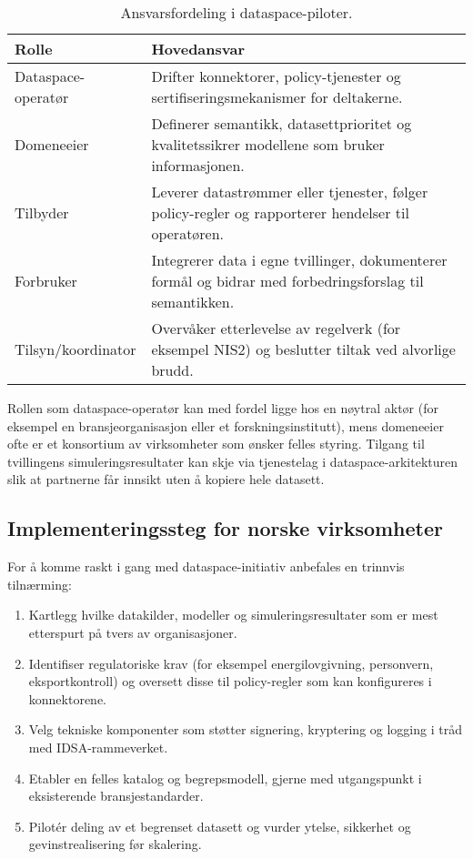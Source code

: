 \begin{table}[ht]
    \centering
    \caption{Ansvarsfordeling i dataspace-piloter.}
    \label{tab:kap03-dataspace-ansvar}
    \begin{tabular}{p{}p{}}
        \toprule
        \textbf{Rolle} & \textbf{Hovedansvar} \\
        \midrule
        Dataspace-operatør & Drifter konnektorer, policy-tjenester og sertifiseringsmekanismer for deltakerne. \\
        Domeneeier & Definerer semantikk, datasettprioritet og kvalitetssikrer modellene som bruker informasjonen. \\
        Tilbyder & Leverer datastrømmer eller tjenester, følger policy-regler og rapporterer hendelser til operatøren. \\
        Forbruker & Integrerer data i egne tvillinger, dokumenterer formål og bidrar med forbedringsforslag til semantikken. \\
        Tilsyn/koordinator & Overvåker etterlevelse av regelverk (for eksempel NIS2) og beslutter tiltak ved alvorlige brudd. \\
        \bottomrule
    \end{tabular}
\end{table}

Rollen som dataspace-operatør kan med fordel ligge hos en nøytral aktør (for eksempel en bransjeorganisasjon eller et
forskningsinstitutt), mens domeneeier ofte er et konsortium av virksomheter som ønsker felles styring. Tilgang til tvillingens
simuleringsresultater kan skje via tjenestelag i dataspace-arkitekturen slik at partnerne får innsikt uten å kopiere hele
datasett.

\subsection{Implementeringssteg for norske virksomheter}
For å komme raskt i gang med dataspace-initiativ anbefales en trinnvis tilnærming:
\begin{enumerate}
    \item Kartlegg hvilke datakilder, modeller og simuleringsresultater som er mest etterspurt på tvers av organisasjoner.
    \item Identifiser regulatoriske krav (for eksempel energilovgivning, personvern, eksportkontroll) og oversett disse til
    policy-regler som kan konfigureres i konnektorene.
    \item Velg tekniske komponenter som støtter signering, kryptering og logging i tråd med IDSA-rammeverket.
    \item Etabler en felles katalog og begrepsmodell, gjerne med utgangspunkt i eksisterende bransjestandarder.
    \item Pilotér deling av et begrenset datasett og vurder ytelse, sikkerhet og gevinstrealisering før skalering.
\end{enumerate}

